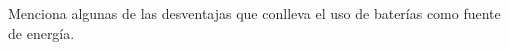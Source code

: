Menciona algunas de las desventajas que conlleva el uso de baterías como fuente de energía.
\fillwithlines{1in}
